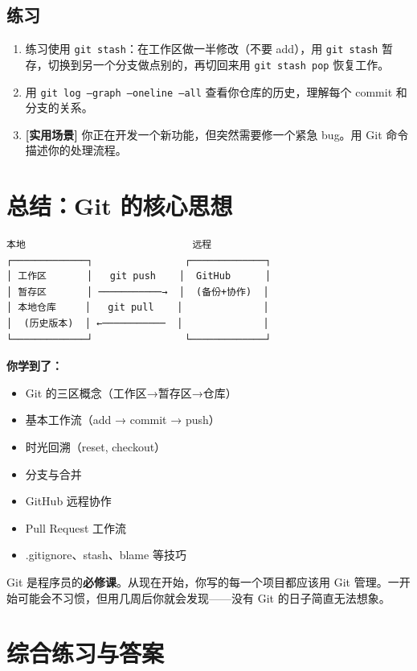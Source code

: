 \documentclass[a4paper,12pt]{ctexart}
\begin{document}
\subsection*{练习}

\begin{enumerate}
  \item 练习使用 \texttt{git stash}：在工作区做一半修改（不要 add），用 \texttt{git stash} 暂存，切换到另一个分支做点别的，再切回来用 \texttt{git stash pop} 恢复工作。
  \item 用 \texttt{git log --graph --oneline --all} 查看你仓库的历史，理解每个 commit 和分支的关系。
  \item \textbf{[实用场景]} 你正在开发一个新功能，但突然需要修一个紧急 bug。用 Git 命令描述你的处理流程。
\end{enumerate}

\section*{总结：Git 的核心思想}

\begin{verbatim}
本地                             远程
┌─────────────┐                ┌─────────────┐
│ 工作区       │   git push    │  GitHub      │
│ 暂存区       │ ───────────→  │  (备份+协作)  │
│ 本地仓库     │   git pull    │              │
│  (历史版本)  │ ←───────────  │              │
└─────────────┘                └─────────────┘
\end{verbatim}

\textbf{你学到了：}
\begin{itemize}
  \item Git 的三区概念（工作区→暂存区→仓库）
  \item 基本工作流（add → commit → push）
  \item 时光回溯（reset, checkout）
  \item 分支与合并
  \item GitHub 远程协作
  \item Pull Request 工作流
  \item .gitignore、stash、blame 等技巧
\end{itemize}

Git 是程序员的\textbf{必修课}。从现在开始，你写的每一个项目都应该用 Git 管理。一开始可能会不习惯，但用几周后你就会发现——没有 Git 的日子简直无法想象。

\section*{综合练习与答案}
\end{document}
